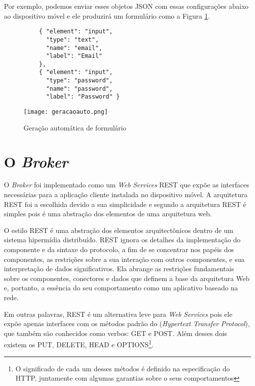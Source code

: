 Por exemplo, podemos enviar esses objetos JSON com essas configurações abaixo ao dispositivo móvel e ele produzirá um formulário como a Figura \ref{fig:geracaoauto}.
\begin{verbatim}
          { "element": "input",
            "type": "text",
            "name": "email",
            "label": "Email"
          },
          { "element": "input",
            "type": "password",
            "name": "password",
            "label": "Password" }
\end{verbatim}

\begin{figure}[!htb]
  \centering
  \texttt{[image: geracaoauto.png]} %
  \caption[Geração automática de formulário]{Geração automática de formulário}
  \label{fig:geracaoauto}
\end{figure}

\section{O \normalfont\itshape Broker}
O \textit{Broker} foi implementado como um \textit{Web Services} REST que expõe as interfaces necessárias para a aplicação cliente instalada no dispositivo móvel. A arquitetura REST foi a escolhida devido a sua simplicidade e segundo \cite{fielding2000architectural} a arquitetura REST é simples pois é uma abstração dos elementos de uma arquitetura web.
\begin{citacao}
O estilo REST é uma abstração dos elementos arquitectônicos dentro de um sistema hipermídia distribuído. REST ignora os detalhes da implementação do componente e da sintaxe do protocolo, a fim de se concentrar nos papéis dos componentes, as restrições sobre a sua interação com outros componentes, e sua interpretação de dados significativos. Ela abrange as restrições fundamentais sobre os componentes, conectores e dados que definem a base da arquitetura Web e, portanto, a essência do seu comportamento como um aplicativo baseado na rede. \cite{fielding2000architectural}
\end{citacao}
Em outras palavras, REST é um alternativa leve para \textit{Web Services} pois ele expõe apenas interfaces com os métodos padrão do  (\textit{Hypertext Transfer Protocol}), que também são conhecidos como verbos: GET e POST. Além desses dois existem os PUT, DELETE, HEAD e OPTIONS\footnote{O significado de cada um desses métodos é definido na especificação do HTTP, juntamente com algumas garantias sobre o seus comportamentos}.

